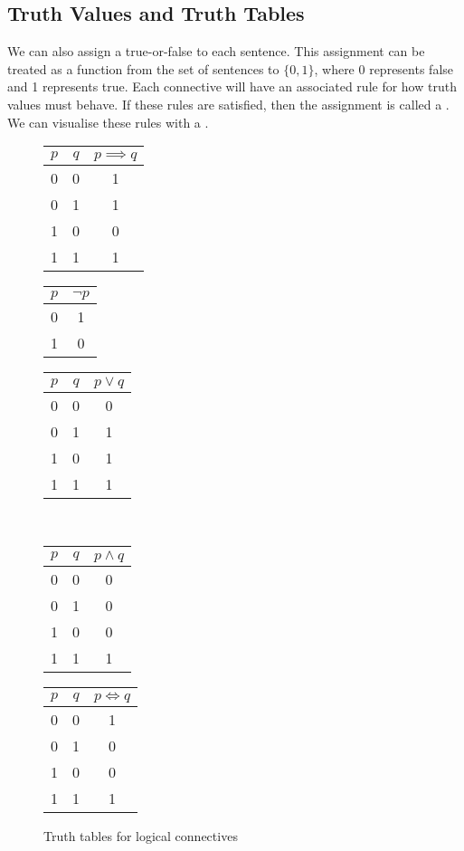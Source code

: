 \documentclass[11pt]{article}
\begin{document}
\subsection{Truth Values and Truth Tables}
We can also assign a true-or-false  to each sentence. This assignment can be treated as a function from the set of sentences to $\{0, 1 \}$, where 0 represents false and 1 represents true.  Each connective will have an associated rule for how truth values must behave. If these rules are satisfied, then the assignment is called a . We can visualise these rules with a . 
\begin{figure}[H]
    \caption{Truth tables for logical connectives}
    \label{fig:truthTablesLogicalConnectives}
    \centering
    \begin{tabular}{|c|c||c|}
        \hline
        $p$ & $q$ & $p \implies q$ \\ \hline
        0 & 0 & 1 \\
        0 & 1 & 1 \\
        1 & 0 & 0 \\
        1 & 1 & 1 \\ \hline
    \end{tabular}\quad
    \begin{tabular}{|c||c|}
        \hline
        $p$ & $\neg p$  \\ \hline
        0 & 1 \\
        1 & 0 \\\hline
    \end{tabular}\quad
    \begin{tabular}{|c|c||c|}
        \hline
        $p$ & $q$ & $p \lor q$ \\ \hline
        0 & 0 & 0 \\
        0 & 1 & 1 \\
        1 & 0 & 1 \\
        1 & 1 & 1 \\ \hline
    \end{tabular}\\
    \begin{tabular}{|c|c||c|}
        \hline
        $p$ & $q$ & $p \land q$ \\ \hline
        0 & 0 & 0 \\
        0 & 1 & 0 \\
        1 & 0 & 0 \\
        1 & 1 & 1 \\ \hline
    \end{tabular}\quad
    \begin{tabular}{|c|c||c|}
        \hline
        $p$ & $q$ & $p \iff q$ \\ \hline
        0 & 0 & 1 \\
        0 & 1 & 0 \\
        1 & 0 & 0 \\
        1 & 1 & 1 \\ \hline
    \end{tabular}
\end{figure}
\end{document}
